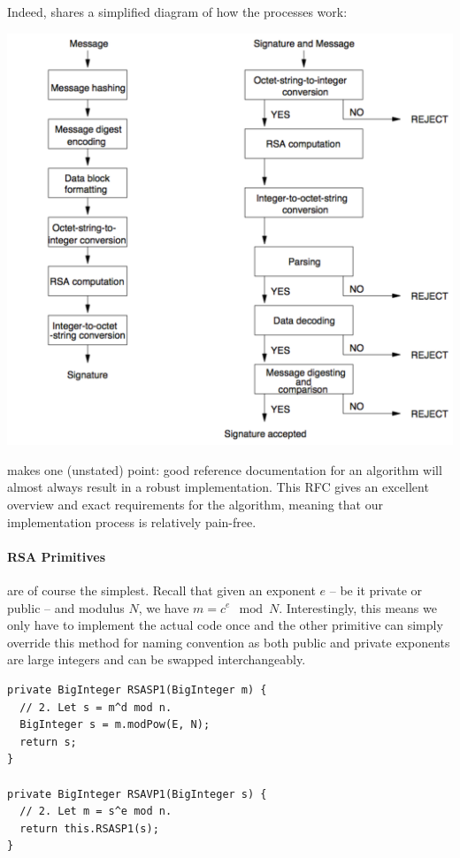     Indeed, \cite{Alfred-Menezes:1996kx} shares a simplified diagram of how the processes work:
    
    \begin{center}
      \includegraphics[scale=0.5]{./Figures/Ch5/5-2-2-2.pdf}
    \end{center}
    
    \cite{Jonsson:2003aa} makes one (unstated) point: good reference documentation for an algorithm will almost always result in a robust implementation. This RFC gives an excellent overview and exact requirements for the algorithm, meaning that our implementation process is relatively pain-free.
    
    \paragraph{RSA Primitives} are of course the simplest. Recall that given an exponent $e$ -- be it private or public -- and modulus $N$, we have $m = c^e \mod N$. Interestingly, this means we only have to implement the actual code once and the other primitive can simply override this method for naming convention as both public and private exponents are large integers and can be swapped interchangeably. \\
    
    \begin{lstlisting}
private BigInteger RSASP1(BigInteger m) {
  // 2. Let s = m^d mod n.
  BigInteger s = m.modPow(E, N);
  return s;
}

private BigInteger RSAVP1(BigInteger s) {
  // 2. Let m = s^e mod n.
  return this.RSASP1(s);
}
\end{lstlisting}
 
